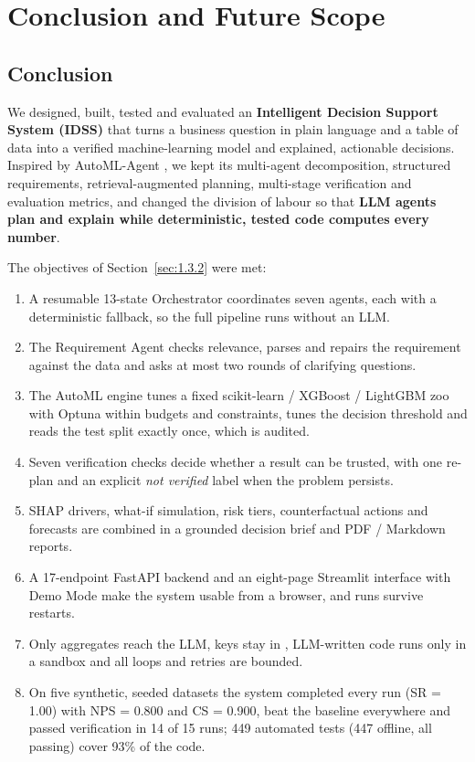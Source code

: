 \chapter{Conclusion and Future Scope}\label{ch:8}

\FloatBarrier
\section{Conclusion}\label{sec:8.1}

We designed, built, tested and evaluated an \textbf{Intelligent Decision Support System (IDSS)} that turns a business question in plain language and a table of data into a verified machine-learning model and explained, actionable decisions. Inspired by AutoML-Agent \cite{ref9}, we kept its multi-agent decomposition, structured requirements, retrieval-augmented planning, multi-stage verification and evaluation metrics, and changed the division of labour so that \textbf{LLM agents plan and explain while deterministic, tested code computes every number}.

The objectives of Section~\ref{sec:1.3.2} were met:

\begin{enumerate}
  \item A resumable 13-state Orchestrator coordinates seven agents, each with a deterministic fallback, so the full pipeline runs without an LLM.
  \item The Requirement Agent checks relevance, parses and repairs the requirement against the data and asks at most two rounds of clarifying questions.
  \item The AutoML engine tunes a fixed scikit-learn / XGBoost / LightGBM zoo with Optuna within budgets and constraints, tunes the decision threshold and reads the test split exactly once, which is audited.
  \item Seven verification checks decide whether a result can be trusted, with one re-plan and an explicit \textit{not verified} label when the problem persists.
  \item SHAP drivers, what-if simulation, risk tiers, counterfactual actions and forecasts are combined in a grounded decision brief and PDF / Markdown reports.
  \item A 17-endpoint FastAPI backend and an eight-page Streamlit interface with Demo Mode make the system usable from a browser, and runs survive restarts.
  \item Only aggregates reach the LLM, keys stay in , LLM-written code runs only in a sandbox and all loops and retries are bounded.
  \item On five synthetic, seeded datasets the system completed every run (SR = 1.00) with NPS = 0.800 and CS = 0.900, beat the baseline everywhere and passed verification in 14 of 15 runs; 449 automated tests (447 offline, all passing) cover 93\% of the code.
\end{enumerate}

